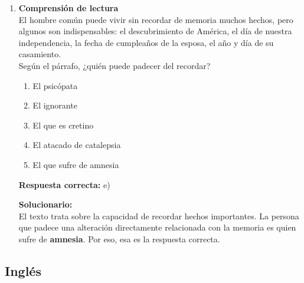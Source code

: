 \begin{enumerate}
	\vspace{6mm}
	
	\item \textbf{Comprensión de lectura}\\
	El hombre común puede vivir sin recordar de memoria muchos hechos, pero algunos son indispensables: el descubrimiento de América, el día de nuestra independencia, la fecha de cumpleaños de la esposa, el año y día de su casamiento.\\
	Según el párrafo, ¿quién puede padecer del recordar?
	\begin{enumerate}[label=\alph*)]
		\item El psicópata
		\item El ignorante
		\item El que es cretino
		\item El atacado de catalepsia
		\item El que sufre de amnesia
	\end{enumerate}
	\textbf{Respuesta correcta:} e)
	
	\vspace{2mm}
	\textbf{Solucionario:}\\
	El texto trata sobre la capacidad de recordar hechos importantes. La persona que padece una alteración directamente relacionada con la memoria es quien sufre de \textbf{amnesia}. Por eso, esa es la respuesta correcta.
	
	\vspace{6mm}
	
\end{enumerate}

\subsection*{Inglés}

